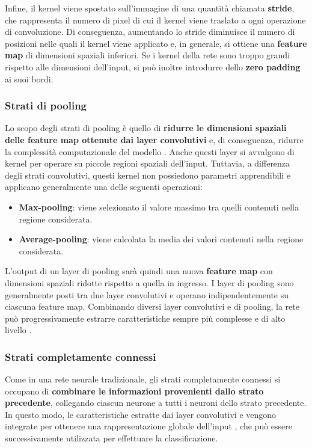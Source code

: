 Infine, il kernel viene spostato sull'immagine di una quantità chiamata \textbf{stride}, che rappresenta il numero di pixel di cui il kernel viene traslato a ogni operazione di convoluzione. Di conseguenza, aumentando lo stride diminuisce il numero di posizioni nelle quali il kernel viene applicato e, in generale, si ottiene una \textbf{feature map} di dimensioni spaziali inferiori. Se i kernel della rete sono troppo grandi rispetto alle dimensioni dell'input, si può inoltre introdurre dello \textbf{zero padding} ai suoi bordi.
\subsubsection{Strati di pooling}
Lo scopo degli strati di pooling è quello di \textbf{ridurre le dimensioni spaziali delle feature map ottenute dai layer convolutivi} e, di conseguenza, ridurre la complessità computazionale del modello \cite{oshea_introduction_2015}. Anche questi layer si avvalgono di kernel per operare su piccole regioni spaziali dell'input. Tuttavia, a differenza degli strati convolutivi, questi kernel non possiedono parametri apprendibili e applicano generalmente una delle seguenti operazioni:
\begin{itemize}
    \item \textbf{Max-pooling}: viene selezionato il valore massimo tra quelli contenuti nella regione considerata.
    \item \textbf{Average-pooling}: viene calcolata la media dei valori contenuti nella regione considerata.
\end{itemize}
L'output di un layer di pooling sarà quindi una nuova \textbf{feature map} con dimensioni spaziali ridotte rispetto a quella in ingresso.  I layer di pooling sono generalmente posti tra due layer convolutivi e operano indipendentemente su ciascuna feature map. Combinando diversi layer convolutivi e di pooling, la rete può progressivamente estrarre caratteristiche sempre più complesse e di alto livello \cite{gu_recent_2018}.
\subsubsection{Strati completamente connessi}
Come in una rete neurale tradizionale, gli strati completamente connessi si occupano di \textbf{combinare le informazioni provenienti dallo strato precedente}, collegando ciascun neurone a tutti i neuroni dello strato precedente. In questo modo, le caratteristiche estratte dai layer convolutivi e vengono integrate per ottenere una rappresentazione globale dell'input \cite{gu_recent_2018}, che può essere successivamente utilizzata per effettuare la classificazione.
